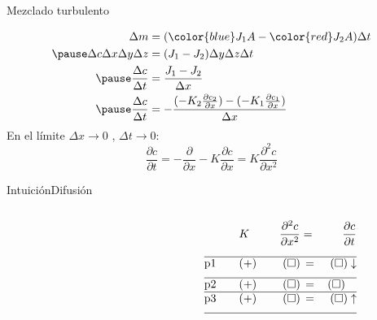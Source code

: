 \begin{frame}{Mezclado turbulento}

\begin{center}
    \DiffPict
\end{center}

$$
\begin{aligned}
\Delta m   &= ({\color{blue}J_1 A }- {\color{red}J_2 A})\Delta t\\ \pause
\Delta c \Delta x \Delta y \Delta z &= (J_1 - J_2) \Delta y \Delta z\Delta t\\ \pause
\dfrac{\Delta c}{\Delta t} &= \dfrac{J_1 - J_2}{\Delta x}\\ \pause
\dfrac{\Delta c}{\Delta t}&= - \dfrac{(-K_2\frac{\partial c_2}{\partial x}) - (-K_1\frac{\partial c_1}{\partial x})}{\Delta x}\\
\end{aligned}
$$
\pause
En el límite $\Delta x\to 0$ , $\Delta t \to 0$:
\pause
    $$\dfrac{\partial c} {\partial t}=-\dfrac{\partial}{\partial x} - K\dfrac{\partial c}{\partial x}=K\dfrac{\partial^2 c}{\partial x^2}$$
\end{frame}
\begin{frame}{Intuición}{Difusión}
 \begin{columns}
 \begin{column}{0.5\textwidth}
 \end{column}
 \begin{column}{0.5\textwidth}  %
     \begin{center}
     \Large 
     $$
     \begin{aligned}
     \text{  }& K &\quad \dfrac{\partial^2 c}{\partial x^2}& =&\dfrac{\partial c}{\partial t}\\[1em]\hline
     \text{p1}\qquad& (+) &\quad (\square)&\,=\,&\,(\square)\downarrow \\[0.6em]\hline
     \text{p2}\qquad& (+) &\quad (\square)&\,=\,&(\square)\quad \\       \hline
     \text{p3}\qquad& (+) &\quad (\square)&\,=\,&\,(\square)\uparrow \\[0.6em]\hline
     \end{aligned}
     $$ 
    \end{center}
    \vfill
 \end{column}
 \end{columns}
\end{frame}

